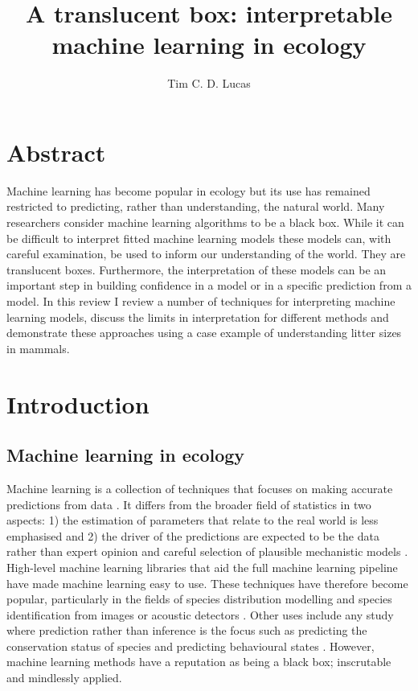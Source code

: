 \documentclass[10pt,]{article}
\title{A translucent box: interpretable machine learning in ecology}
\author{Tim C. D. Lucas}
\date{}
\begin{document}
\maketitle

\section{Abstract}\label{abstract}

Machine learning has become popular in ecology but its use has remained restricted to predicting, rather than understanding, the natural world.
Many researchers consider machine learning algorithms to be a black box.
While it can be difficult to interpret fitted machine learning models these models can, with careful examination, be used to inform our understanding of the world.
They are translucent boxes.
Furthermore, the interpretation of these models can be an important step in building confidence in a model or in a specific prediction from a model.
In this review I review a number of techniques for interpreting machine learning models, discuss the limits in interpretation for different methods and demonstrate these approaches using a case example of understanding litter sizes in mammals.




\section{Introduction}\label{introduction}

\subsection{Machine learning in ecology}\label{machine-learning-in-ecology}

Machine learning is a collection of techniques that focuses on making accurate predictions from data \citep{crisci2012review, breiman2001statistical}.
It differs from the broader field of statistics in two aspects: 1) the estimation of parameters that relate to the real world is less emphasised and 2) the driver of the predictions are expected to be the data rather than expert opinion and careful selection of plausible mechanistic models \citep{breiman2001statistical}.
High-level machine learning libraries that aid the full machine learning pipeline \citep{caret, scikit, maxent, biomod} have made machine learning easy to use.
These techniques have therefore become popular, particularly in the fields of species distribution modelling \citep{maxent, biomod, elith2006novel, golding2018zoon, gobeyn2019evolutionary} and species identification from images or acoustic detectors \citep{mac2018bat, waldchen2018machine, shamir2014classification, xue2017automatic}.
Other uses include any study where prediction rather than inference is the focus such as predicting the conservation status of species \citep{bland2015predicting} and predicting behavioural states \citep{browning2018predicting}.
However, machine learning methods have a reputation as being a black box; inscrutable and mindlessly applied.
\end{document}
